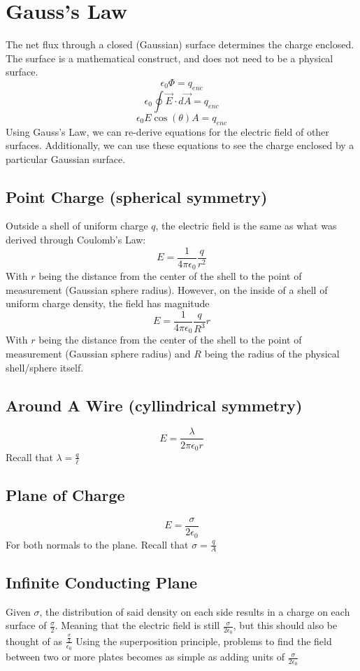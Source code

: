 \documentclass[]{article}
\begin{document}
\section{Gauss's Law}
The net flux through a closed (Gaussian) surface determines the charge enclosed. The surface is a mathematical construct, and does not need to be a physical surface.
\[ \epsilon_0 \Phi = q_{enc} \]
\[ \epsilon_0 \oint \vec{E} \cdot d\vec{A} = q_{enc} \]
\[ \epsilon_0 E \cos(\theta) A = q_{enc}\]
Using Gauss's Law, we can re-derive equations for the electric field of other surfaces. Additionally, we can use these equations to see the charge enclosed by a particular Gaussian surface.

\subsection{Point Charge (spherical symmetry)}
Outside a shell of uniform charge $ q $, the electric field is the same as what was derived through Coulomb's Law:
\[ E = \frac{1}{4\pi\epsilon_0} \frac{q}{r^2} \]
With $ r $ being the distance from the center of the shell to the point of measurement (Gaussian sphere radius). However, on the inside of a shell of uniform charge density, the field has magnitude
\[ E = \frac{1}{4\pi\epsilon_0} \frac{q}{R^3} r \]
With $ r $ being the distance from the center of the shell to the point of measurement (Gaussian sphere radius) and $ R $ being the radius of the physical shell/sphere itself.

\subsection{Around A Wire (cyllindrical symmetry)}
\[ E = \frac{\lambda}{2\pi\epsilon_0 r} \]
Recall that $ \lambda = \frac{q}{\ell} $

\subsection{Plane of Charge}
\[ E = \frac{\sigma}{2\epsilon_0} \]
For both normals to the plane. Recall that $ \sigma = \frac{q}{A} $

\subsection{Infinite Conducting Plane}
Given $ \sigma $, the distribution of said density on each side results in a charge on each surface of $ \frac{\sigma}{2} $. Meaning that the electric field is still $ \frac{\sigma}{2 \epsilon_{0}} $, but this should also be thought of as $ \frac{\frac{\sigma}{2}}{\epsilon_{0}} $
Using the superposition principle, problems to find the field between two or more plates becomes as simple as adding units of $ \frac{\sigma}{2\epsilon_0} $
\end{document}
